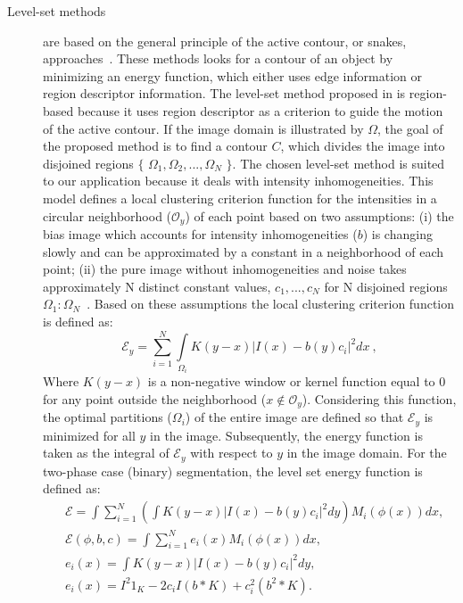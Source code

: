 \begin{description}
\item[Level-set methods] are based on the general principle of the active contour, or snakes, approaches~\cite{kass1988snakes}.
These methods looks for a contour of an object by minimizing an energy function, which either uses edge information or region descriptor information.
The level-set method proposed in \cite{li2011level} is region-based because it uses region descriptor as a criterion to guide the motion of the active contour.
If the image domain is illustrated by $\Omega$, the goal of the proposed method is to find a contour $C$, which divides the image into disjoined regions $\{$ $\Omega_{1}, \Omega_{2},..., \Omega_{N}$ $\}$.
The chosen level-set method is suited to our application because it deals with intensity inhomogeneities.
This model defines a local clustering criterion function for the intensities in a circular neighborhood ($\mathcal{O}_{y}$) of each point based on two assumptions: 
(i) the bias image which accounts for intensity inhomogeneities ($b$) is changing slowly and can be approximated by a constant in a neighborhood of each point;
(ii) the pure image without inhomogeneities and noise takes approximately N distinct constant values, $c_{1}, ..., c_{N}$ for N disjoined regions $\Omega_{1}:\Omega_{N}$~\cite{li2011level}.
Based on these assumptions the local clustering criterion function is defined as: 
\begin{equation}
\mathcal{E}_{y} = \sum\limits_{i=1}^{N}\int\limits_{\Omega_{i}} K(y-x)\vert I(x)-b(y)c_{i} \vert^{2} dx~,
\label{eq:ls-lccf}
\end{equation}
\noindent Where $K(y-x)$ is a non-negative window or kernel function equal to 0 for any point outside the neighborhood ($x \notin \mathcal{O}_{y}$).
Considering this function, the optimal partitions ($\Omega_{i}$) of the entire image are defined so that $\mathcal{E}_{y}$ is minimized for all $y$ in the image.
Subsequently, the energy function is taken as the integral of $\mathcal{E}_{y}$ with respect to $y$ in the image domain. 
For the two-phase case (binary) segmentation, the level set energy function is defined as: 
\begin{subequations}
\begin{align}
& \mathcal{E}  = \int \sum\limits_{i=1}^{N}\left( \int K(y-x)\vert I(x) - b(y)c_{i}\vert^{2} dy \right) M_{i}(\phi(x)) dx, \\
& \mathcal{E}(\phi,b,c)  = \int \sum\limits_{i=1}^{N} e_{i}(x) M_{i}(\phi(x)) dx,\\
& e_{i}(x) =  \int K(y-x)\vert I(x) - b(y)c_{i}\vert^{2} dy,\\
& e_{i}(x)  = I^{2}1_{K} - 2c_{i}I(b\ast K)+c_{i}^{2}(b^{2}\ast K).
\label{eq:ls-energy}
\end{align}
\end{subequations}


\end{description}
